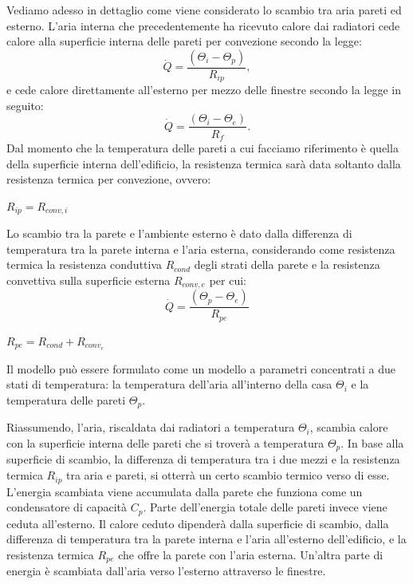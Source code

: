 \documentclass[laurea,oneside,11pt]{USiena_tesiLM}
\begin{document}
Vediamo adesso in dettaglio come viene considerato lo scambio tra aria pareti ed esterno. L'aria interna che precedentemente ha ricevuto calore dai radiatori cede calore alla superficie interna delle pareti per convezione secondo la legge:
\begin{equation}
\dot{Q} = \frac{(\Theta_i - \Theta_p)}{R_{ip}} ,
\end{equation} 
e cede calore direttamente all'esterno per mezzo delle finestre secondo la legge in seguito:
\begin{equation}
\dot{Q} = \frac{(\Theta_i - \Theta_e)}{R_{f}} .
\end{equation} 
Dal momento che la temperatura delle pareti a cui facciamo riferimento è quella della superficie interna dell'edificio, la resistenza termica sarà data soltanto dalla resistenza termica per convezione, ovvero:
\begin{center}
$R_{ip} = R_{conv,i}$
\end{center}

Lo scambio tra la parete e l'ambiente esterno è dato dalla differenza di temperatura tra la parete interna e l'aria  esterna, considerando come resistenza termica la resistenza conduttiva $R_{cond}$ degli strati della parete e la resistenza convettiva sulla superficie esterna $R_{conv,e}$ per cui:
\begin{equation}
\dot{Q} = \frac{(\Theta_p - \Theta_e)}{R_{pe}} 
\end{equation} 
\begin{center}
$R_{pe} = R_{cond} + R_{conv_e}$
\end{center}

Il modello può essere formulato come un modello a parametri concentrati a due stati di temperatura: la temperatura dell'aria all'interno della casa $\Theta_i$ e la temperatura delle pareti $\Theta_p$.

Riassumendo, l'aria, riscaldata dai radiatori a temperatura $\Theta_i$, scambia calore con la superficie interna delle pareti che si troverà a temperatura $\Theta_p$. In base alla superficie di scambio, la differenza di temperatura tra i due mezzi e la resistenza termica $R_{ip}$ tra aria e pareti, si otterrà un certo scambio termico verso di esse. L'energia scambiata viene accumulata dalla parete che funziona come un condensatore di capacità $C_p$. Parte dell'energia totale delle pareti invece viene ceduta all'esterno. Il calore ceduto dipenderà dalla superficie di scambio, dalla differenza di temperatura tra la parete interna e l'aria all'esterno dell'edificio, e la resistenza termica $R_{pe}$ che offre la parete con l'aria esterna. Un'altra parte di energia è scambiata dall'aria verso l'esterno attraverso le finestre.  
\end{document}
